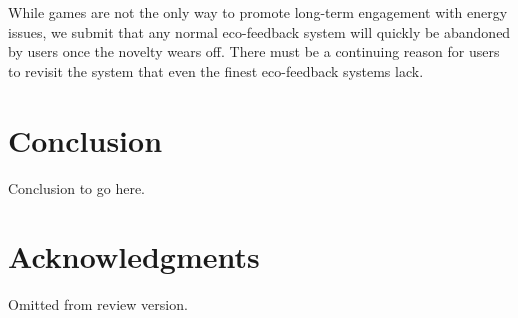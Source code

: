 \documentclass{sigchi}
\begin{document}
While games are not the only way to promote long-term engagement with energy issues, we submit that any normal eco-feedback system will quickly be abandoned by users once the novelty wears off. There must be a continuing reason for users to revisit the system that even the finest eco-feedback systems lack.


\section{Conclusion}

Conclusion to go here.

\section{Acknowledgments}

Omitted from review version.


%
%
%
%
%
\balance



\end{document}
